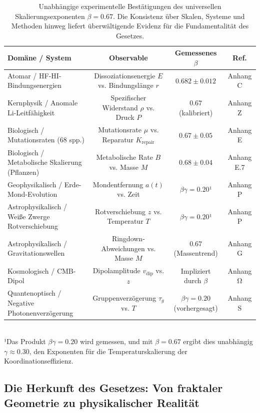 \documentclass[11pt,a4paper]{article}
\begin{document}
	\begin{table}[htbp]
		\centering
		\small
		\setlength{\tabcolsep}{0pt}
		\caption{Unabhängige experimentelle Bestätigungen des universellen Skalierungsexponenten \(\beta = 0.67\). Die Konsistenz über Skalen, Systeme und Methoden hinweg liefert überwältigende Evidenz für die Fundamentalität des Gesetzes.}
		\label{tab:scaling_confirmations}
		\begin{tabular}{@{}lccc@{}}
			\toprule
			\textbf{Domäne / System} & \textbf{Observable} & \textbf{Gemessenes \(\beta\)} & \textbf{Ref.} \\
			\midrule
			Atomar / HF-HI-Bindungsenergien & Dissoziationsenergie \(E\) vs. Bindungslänge \(r\) & \(0.682 \pm 0.012\) & Anhang C \\
			Kernphysik / Anomale Li-Leitfähigkeit & Spezifischer Widerstand \(\rho\) vs. Druck \(P\) & \(0.67\) (kalibriert) & Anhang Z \\
			Biologisch / Mutationsraten (68 spp.) & Mutationsrate \(\mu\) vs. Reparatur \(K_{\mathrm{repair}}\) & \(0.67 \pm 0.05\) & Anhang E \\
			Biologisch / Metabolische Skalierung (Pflanzen) & Metabolische Rate \(B\) vs. Masse \(M\) & \(0.68 \pm 0.04\) & Anhang E.7 \\
			Geophysikalisch / Erde-Mond-Evolution & Mondentfernung \(a(t)\) vs. Zeit & \(\beta\gamma = 0.20\)¹ & Anhang P \\
			Astrophysikalisch / Weiße Zwerge Rotverschiebung & Rotverschiebung \(z\) vs. Temperatur \(T\) & \(\beta\gamma = 0.20\)¹ & Anhang P \\
			Astrophysikalisch / Gravitationswellen & Ringdown-Abweichungen vs. Masse \(M\) & \(0.67\) (Massentrend) & Anhang G \\
			Kosmologisch / CMB-Dipol & Dipolamplitude \(v_{\mathrm{dip}}\) vs. \(z\) & Impliziert durch \(\beta\) & Anhang Ω \\
			Quantenoptisch / Negative Photonenverzögerung & Gruppenverzögerung \(\tau_g\) vs. \(T\) & \(\beta\gamma = 0.20\) (vorhergesagt) & Anhang S \\
			\bottomrule
		\end{tabular}
		\\[4pt]
		\footnotesize{¹Das Produkt \(\beta\gamma = 0.20\) wird gemessen, und mit \(\beta = 0.67\) ergibt dies unabhängig \(\gamma \approx 0.30\), den Exponenten für die Temperaturskalierung der Koordinationseffizienz.}
	\end{table}
	
	\subsection{Die Herkunft des Gesetzes: Von fraktaler Geometrie zu physikalischer Realität}
	
\end{document}
